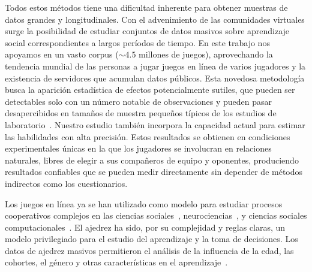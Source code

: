 \documentclass[a4paper,11pt]{book}
\theoremstyle{definition}
\begin{document}

Todos estos métodos tiene una dificultad inherente para obtener muestras de datos grandes y longitudinales.
%
Con el advenimiento de las comunidades virtuales surge la posibilidad de estudiar conjuntos de datos masivos sobre aprendizaje social correspondientes a largos períodos de tiempo.
%
En este trabajo nos apoyamos en un vasto corpus ($\sim4.5$ millones de juegos), aprovechando la tendencia mundial de las personas a jugar juegos en línea de varios jugadores y la existencia de servidores que acumulan datos públicos.
%
Esta novedosa metodología busca la aparición estadística de efectos potencialmente sutiles, que pueden ser detectables solo con un número notable de observaciones y pueden pasar desapercibidos en tamaños de muestra pequeños típicos de los estudios de laboratorio~\cite{slezak2012-doNotFearYourOpponent}.
%
Nuestro estudio también incorpora la capacidad actual para estimar las habilidades con alta precisión.
%
Estos resultados se obtienen en condiciones experimentales únicas en la que los jugadores se involucran en relaciones naturales, libres de elegir a sus compañeros de equipo y oponentes, produciendo resultados confiables que se pueden medir directamente sin depender de métodos indirectos como los cuestionarios.


Los juegos en línea ya se han utilizado como modelo para estudiar procesos cooperativos complejos en las ciencias sociales~\cite{Beheim2014,Johnson2009-onlineGuildsOfflineGangs}, neurociencias~\cite{slezak2012-doNotFearYourOpponent,sigman2010-chess}, y ciencias sociales computacionales~\cite{delong2013-phd_teamChemistry, shim2010-teamPerformancePrediction}.
%
El ajedrez ha sido, por su complejidad y reglas claras, un modelo privilegiado para el estudio del aprendizaje y la toma de decisiones.
%
Los datos de ajedrez masivos permitieron el análisis de la influencia de la edad, las cohortes, el género y otras características en el aprendizaje~\cite{chabris_glickman2006-sexDifferencesChessPerformance, roring2007-expertiseInChessAcrossLifeSpan,vaci2016-chessDatabasesAgePerformance}.

\end{document}
